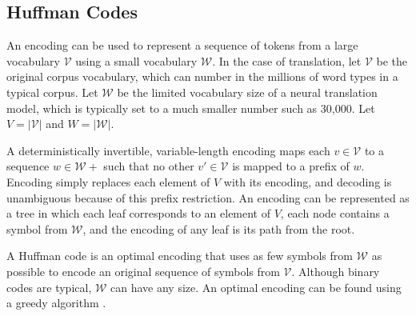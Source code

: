 \subsection{Huffman Codes}

An encoding can be used to represent a sequence of tokens from a large
vocabulary $\mathcal{V}$ using a small vocabulary $\mathcal{W}$.  In the case
of translation, let $\mathcal{V}$ be the original corpus vocabulary, which can
number in the millions of word types in a typical corpus. Let $\mathcal{W}$ be
the limited vocabulary size of a neural translation model, which is typically
set to a much smaller number such as 30,000. Let $V=|\mathcal{V}|$ and
$W=|\mathcal{W}|$.

A deterministically invertible, variable-length encoding maps each
$v\in\mathcal{V}$ to a sequence $w \in \mathcal{W}+$ such that no other
$v'\in\mathcal{V}$ is mapped to a prefix of $w$. Encoding simply replaces each
element of $V$ with its encoding, and decoding is unambiguous because of this
prefix restriction. An encoding can be represented as a tree in which each leaf
corresponds to an element of $V$, each node contains a symbol from
$\mathcal{W}$, and the encoding of any leaf is its path from the root.

A Huffman code is an optimal encoding that uses as few symbols from
$\mathcal{W}$ as possible to encode an original sequence of symbols from
$\mathcal{V}$. Although binary codes are typical, $\mathcal{W}$ can have any
size. An optimal encoding can be found using a greedy algorithm
\cite{huffman}.
